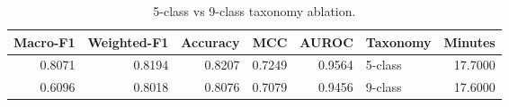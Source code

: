 \begin{table}
\caption{5-class vs 9-class taxonomy ablation.}
\label{tab:taxonomy_ablation}
\begin{tabular}{rrrrrlr}
\toprule
Macro-F1 & Weighted-F1 & Accuracy & MCC & AUROC & Taxonomy & Minutes \\
\midrule
0.8071 & 0.8194 & 0.8207 & 0.7249 & 0.9564 & 5-class & 17.7000 \\
0.6096 & 0.8018 & 0.8076 & 0.7079 & 0.9456 & 9-class & 17.6000 \\
\bottomrule
\end{tabular}
\end{table}
